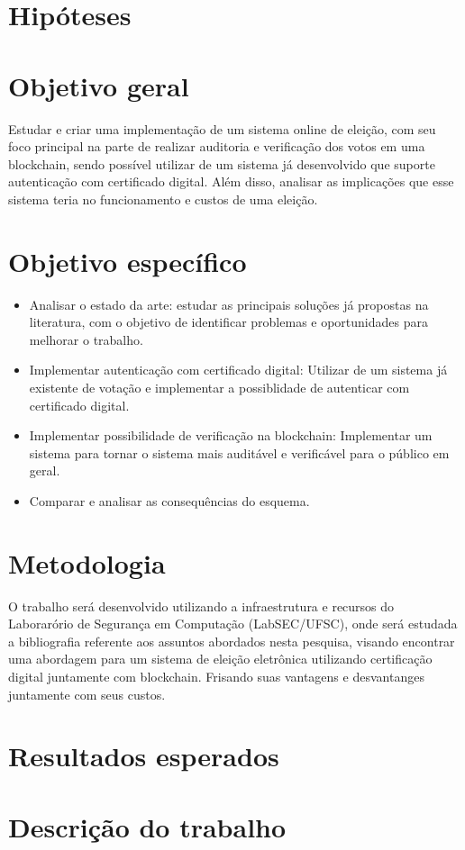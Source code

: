 \documentclass{ufsctex/ufsctex}
\begin{document}
\section{Hipóteses}

\section{Objetivo geral}

Estudar e criar uma implementação de um sistema
online de eleição, com seu foco principal na parte de realizar auditoria e
verificação dos votos em uma blockchain, sendo possível utilizar de um sistema
já desenvolvido que suporte autenticação com certificado digital. Além disso,
analisar as implicações que esse sistema teria no funcionamento e custos de
uma eleição. \\

\section{Objetivo específico}

\begin{itemize}
	\item Analisar o estado da arte: estudar as principais soluções
	já propostas na literatura, com o objetivo de identificar problemas
	e oportunidades para melhorar o trabalho.
	\item Implementar autenticação com certificado digital: Utilizar
	de um sistema já existente de votação e implementar a possiblidade
	de autenticar com certificado digital.
	\item Implementar possibilidade de verificação na blockchain:
	Implementar um sistema para tornar o sistema mais auditável e 
	verificável para o público em geral.
	\item Comparar e analisar as consequências do esquema.
\end{itemize}

\section{Metodologia}

O trabalho será desenvolvido utilizando a infraestrutura e recursos do
Laborarório de Segurança em Computação (LabSEC/UFSC), onde será estudada
a bibliografia referente aos assuntos abordados nesta pesquisa, visando
encontrar uma abordagem para um sistema de eleição eletrônica utilizando
certificação digital juntamente com blockchain. Frisando suas vantagens e
desvantanges juntamente com seus custos.

\section{Resultados esperados}

\section{Descrição do trabalho}





\end{document}
